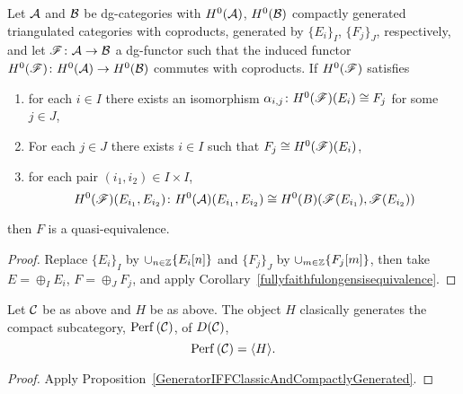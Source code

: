 \documentclass[dissertation.tex]{subfiles}
\begin{document}
\begin{prop}
  Let $\mathcal{A}$ and $\mathcal{B}$ be dg-categories with $H^0(\mathcal{A})$, $H^0(\mathcal{B})$ compactly generated triangulated categories with coproducts, generated by $\{E_i\}_I$, $\{F_j\}_J$, respectively, and let $\mathscr{F} \colon \mathcal{A} \to\mathcal{B}$ a dg-functor such that the induced functor $H^0(\mathscr{F}) \colon H^0(\mathcal{A}) \to H^0(\mathcal{B})$ commutes with coproducts.
  If $H^0(\mathscr{F})$ satisfies
  \begin{enumerate}
  \item
    for each $i \in I$ there exists an isomorphism $\alpha_{i,j} \colon H^0(\mathscr{F})(E_i) \cong F_j$ for some $j \in J$,
  \item
    For each $j \in J$ there exists $i \in I$ such that $F_j \cong H^0(\mathscr{F})(E_i)$,
  \item
    for each pair $(i_1, i_2) \in I \times I$,
    $$H^0(\mathscr{F})(E_{i_1}, E_{i_2}) \colon H^0(\mathcal{A})(E_{i_1}, E_{i_2}) \cong H^0(B)(\mathscr{F}(E_{i_1}), \mathscr{F}(E_{i_2}))$$
  \end{enumerate}
  then $F$ is a quasi-equivalence.

  \begin{proof}
    Replace $\{E_i\}_I$ by $\cup_{n \in \mathbb{Z}}\{E_i[n]\}$ and $\{F_j\}_J$ by $\cup_{m \in \mathbb{Z}}\{F_j[m]\}$, then take $E = \oplus_I E_i$, $F = \oplus_J F_j$, and apply Corollary~\ref{fullyfaithfulongensisequivalence}.
  \end{proof}
\end{prop}

\begin{cor}
  Let $\mathcal{C}$ be as above and $H$ be as above.
  The object $H$ clasically generates the compact subcategory, $\operatorname{Perf}\left(\mathcal{C}\right)$, of $D(\mathcal{C})$,
  $$\operatorname{Perf}\left(\mathcal{C}\right) = \langle H \rangle.$$

  \begin{proof}
    Apply Proposition~\ref{GeneratorIFFClassicAndCompactlyGenerated}.
  \end{proof}
\end{cor}
\end{document}
